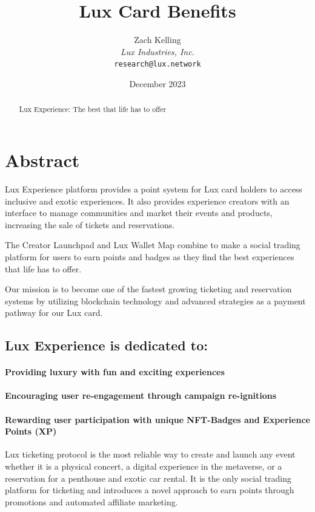 \documentclass[11pt]{article}
\title{Lux Card Benefits}
\author{Zach Kelling\\\textit{Lux Industries, Inc.}\\\texttt{research@lux.network}}
\date{December 2023}
\begin{document}
\luxcoverpage

\begin{abstract}
Lux Experience: The best that life has to offer
\end{abstract}

\tableofcontents
\newpage


\section{Abstract}

Lux Experience platform provides a point system for Lux card holders to access inclusive and exotic experiences. It also provides experience creators with an interface to manage communities and market their events and products, increasing the sale of tickets and reservations.


The Creator Launchpad and Lux Wallet Map combine to make a social trading platform for users to earn points and badges as they find the best experiences that life has to offer.


Our mission is to become one of the fastest growing ticketing and reservation systems by utilizing blockchain technology and advanced strategies as a payment pathway for our Lux card.


\subsection{Lux Experience is dedicated to:}

\paragraph{Providing luxury with fun and exciting experiences}

\paragraph{Encouraging user re-engagement through campaign re-ignitions}

\paragraph{Rewarding user participation with unique NFT-Badges and Experience Points (XP)}

Lux ticketing protocol is the most reliable way to create and launch any event whether it is a physical concert, a digital experience in the metaverse, or a reservation for a penthouse and exotic car rental. It is the only social trading platform for ticketing and introduces a novel approach to earn points through promotions and automated affiliate marketing.
\end{document}

